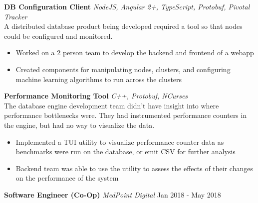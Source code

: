 \documentclass[a4paper]{article}
\begin{document}
\begin{addmargin}[1em]{2em}%
{\textbf{DB Configuration Client}} {\sl NodeJS, Angular 2+, TypeScript, Protobuf, Pivotal Tracker} \\
    A distributed database product being developed required a tool so that nodes could be configured and monitored.
\vspace*{-2mm}
\begin{itemize}[leftmargin=4.5mm] \itemsep -1mm
	\item Worked on a 2 person team to develop the backend and frontend of a webapp
	\item Created components for manipulating nodes, clusters, and configuring machine learning algorithms to run across the clusters
\end{itemize}
\vspace*{2mm}

{\textbf{Performance Monitoring Tool}} {\sl C++, Protobuf, NCurses} \\
    The database engine development team didn't have insight into where performance bottlenecks were. 
    They had instrumented performance counters in the engine, but had no way to visualize the data.
\vspace*{-2mm}
\begin{itemize}[leftmargin=4.5mm] \itemsep -1mm
	\item Implemented a TUI utility to visualize performance counter data as benchmarks were run on the database, or emit CSV for further analysis
	\item Backend team was able to use the utility to assess the effects of their changes on the performance of the system
\end{itemize}
\vspace*{2mm}
\end{addmargin}



\textbf{Software Engineer (Co-Op)} \textit{MedPoint Digital} \hfill Jan 2018 - May 2018\\
\end{document}
